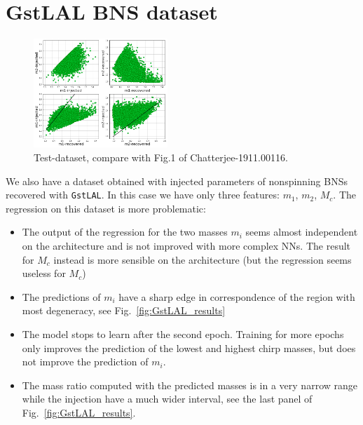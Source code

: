 \documentclass[prd,aps,twocolumn,a4paper,showkeys,nofootinbib]{article}
\begin{document}
\section{GstLAL BNS dataset}
\label{sec:GstLAL}
\begin{figure}[]
  \center
  \includegraphics[width=0.45\textwidth]{./Figs/GstLAL_paperlike_m1m2.png}
  \caption{\label{fig:GstLAL_paperlike} Test-dataset, compare with Fig.1 of Chatterjee-1911.00116.}
\end{figure}

We also have a dataset obtained with injected parameters of nonspinning 
BNSs recovered with \texttt{GstLAL}.
In this case we have only three features: $m_1$, $m_2$, $M_c$.
The regression on this dataset is more problematic:
\begin{itemize}
\item The output of the regression for the two masses $m_i$ seems almost independent on the 
architecture and is not improved with more complex NNs. The result for $M_c$ instead is 
more sensible on the architecture (but the regression seems useless for $M_c$)

\item The predictions of $m_i$ have a sharp edge in correspondence of the region with 
most degeneracy, see Fig.~\ref{fig:GstLAL_results}

\item The model stops to learn after the second epoch. Training for more epochs only improves
the prediction of the lowest and highest chirp masses, but does not improve the prediction
of $m_i$. 

\item The mass ratio computed with the predicted masses is in a very narrow range while
the injection have a much wider interval, see the last panel of Fig.~\ref{fig:GstLAL_results}.

\end{itemize} 
\end{document}
